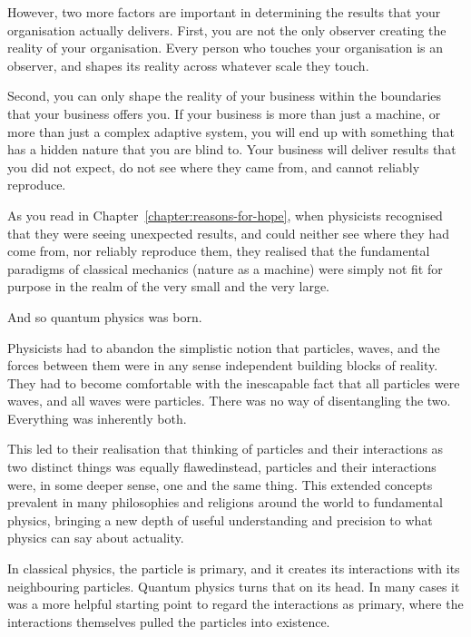 However, two more factors are important in determining the results that your organisation actually delivers. First, you are not the only observer creating the reality of your organisation. Every person who touches your organisation is an observer, and shapes its reality across whatever scale they touch. 


Second, you can only shape the reality of your business within the boundaries that your business offers you. If your business is more than just a machine, or more than just a complex adaptive system, you will end up with something that has a hidden nature that you are blind to. Your business will deliver results that you did not expect, do not see where they came from, and cannot reliably reproduce.


As you read in Chapter~\ref{chapter:reasons-for-hope}, when physicists recognised that they were seeing unexpected results, and could neither see where they had come from, nor reliably reproduce them, they realised that the fundamental paradigms of classical mechanics (nature as a machine) were simply not fit for purpose in the realm of the very small and the very large.


And so quantum physics was born.


Physicists had to abandon the simplistic notion that particles, waves, and the forces between them were in any sense independent building blocks of reality. They had to become comfortable with the inescapable fact that all particles were waves, and all waves were particles. There was no way of disentangling the two. Everything was inherently both.


This led to their realisation that thinking of particles and their interactions as two distinct things was equally flawed\textemdash instead, particles and their interactions were, in some deeper sense, one and the same thing. This extended concepts prevalent in many philosophies and religions around the world\cite{capra-tao} to fundamental physics, bringing a new depth of useful understanding and precision to what physics can say about actuality.


In classical physics, the particle is primary, and it creates its interactions with its neighbouring particles. Quantum physics turns that on its head. In many cases it was a more helpful starting point to regard the interactions as primary, where the interactions themselves pulled the particles into existence. 


